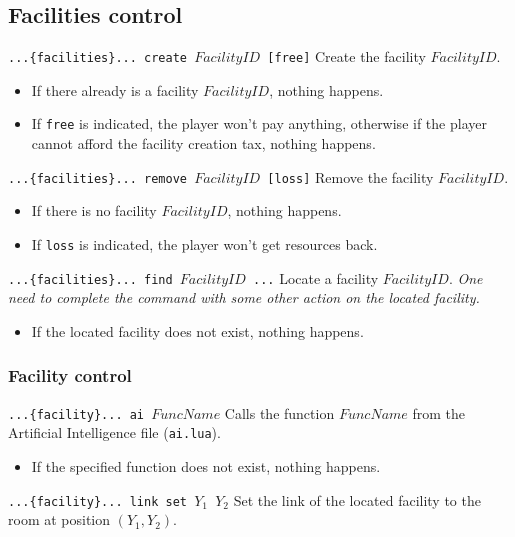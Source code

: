\documentclass[10pt,a4paper]{scrartcl}
\newenvironment{apiCode}[1]
{ \begin{lrbox}{\mybox} \begin{minipage}{0.9\textwidth} {\color{Mahogany} \small\texttt{#1}} \vspace{8pt} \newline }
{ \end{minipage} \end{lrbox}\fbox{\usebox{\mybox}} \newline\vspace{4pt}\newline }
\begin{document}
\subsection{Facilities control}
\begin{apiCode}{...\{facilities\}... create $FacilityID$ [free]}
Create the facility $FacilityID$.
\begin{itemize}
\itemsep 0em
\item If there already is a facility $FacilityID$, nothing happens.
\item If \verb#free# is indicated, the player won't pay anything,\newline
	  otherwise if the player cannot afford the facility creation tax, nothing happens.
\end{itemize}
\end{apiCode}
\begin{apiCode}{...\{facilities\}... remove $FacilityID$ [loss]}
Remove the facility $FacilityID$.
\begin{itemize}
\itemsep 0em
\item If there is no facility $FacilityID$, nothing happens.
\item If \verb#loss# is indicated, the player won't get resources back.
\end{itemize}
\end{apiCode}
\begin{apiCode}{...\{facilities\}... find $FacilityID$ ...}
Locate a facility $FacilityID$.\newline
\textit{One need to complete the command with some other action on the located facility.}
\begin{itemize}
\itemsep 0em
\item If the located facility does not exist, nothing happens.
\end{itemize}
\end{apiCode}

\subsubsection*{Facility control}
\begin{apiCode}{...\{facility\}... ai $FuncName$}
Calls the function $FuncName$ from the Artificial Intelligence file (\texttt{ai.lua}).
\begin{itemize}
\itemsep 0em
\item If the specified function does not exist, nothing happens.
\end{itemize}
\end{apiCode}
\begin{apiCode}{...\{facility\}... link set $Y_1$ $Y_2$}
Set the link of the located facility to the room at position $(Y_1, Y_2)$.
\end{apiCode}
\end{document}
